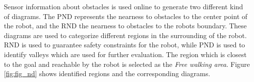 Sensor information about obstacles is used online to generate two different kind of diagrams.
The PND represents the nearness to obstacles to the center point of the robot, and the RND the nearness to obstacles to the robots boundary. 
These diagrams are used to categorize different regions in the surrounding of the robot.
RND is used to guarantee safety constraints for the robot, while PND is used to identify valleys which are used for further evaluation.
The region which is closest to the goal and reachable by the robot is selected as the \emph{Free walking area}.
Figure \ref{fig:fig_nd} shows identified regions and the corresponding diagrams.
\begin{figure}[thpb]
	  \myfloatalign
      \footnotesize
      \centering
    \\
\end{figure}
